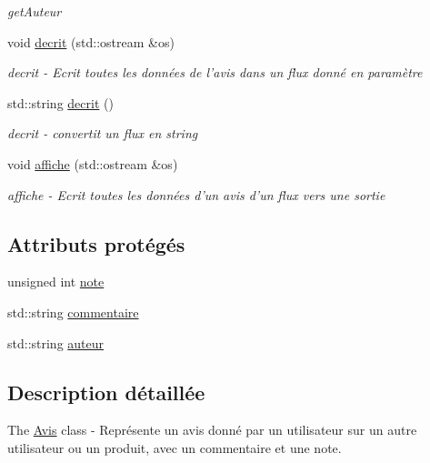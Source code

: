 \begin{DoxyCompactItemize}
\begin{DoxyCompactList}\small\item\em get\-Auteur \end{DoxyCompactList}\item 
void \hyperlink{class_avis_abbab76777e1327d7f88d20fce541c7a5}{decrit} (std\-::ostream \&os)
\begin{DoxyCompactList}\small\item\em decrit -\/ Ecrit toutes les données de l'avis dans un flux donné en paramètre \end{DoxyCompactList}\item 
std\-::string \hyperlink{class_avis_a517878e3f5196c23cc179f3fe5a1a98d}{decrit} ()
\begin{DoxyCompactList}\small\item\em decrit -\/ convertit un flux en string \end{DoxyCompactList}\item 
void \hyperlink{class_avis_af94b335023000d4ded81528c90e86c32}{affiche} (std\-::ostream \&os)
\begin{DoxyCompactList}\small\item\em affiche -\/ Ecrit toutes les données d'un avis d'un flux vers une sortie \end{DoxyCompactList}\end{DoxyCompactItemize}
\subsection*{Attributs protégés}
\begin{DoxyCompactItemize}
\item 
unsigned int \hyperlink{class_avis_ab1833bedfe52d33098e2bde7170ba476}{note}
\item 
std\-::string \hyperlink{class_avis_ac0bfa4072b5f6a9e232de92311933f9c}{commentaire}
\item 
std\-::string \hyperlink{class_avis_a4cb88a456146bc552646a5648f7761f8}{auteur}
\end{DoxyCompactItemize}


\subsection{Description détaillée}
The \hyperlink{class_avis}{Avis} class -\/ Représente un avis donné par un utilisateur sur un autre utilisateur ou un produit, avec un commentaire et une note. 

